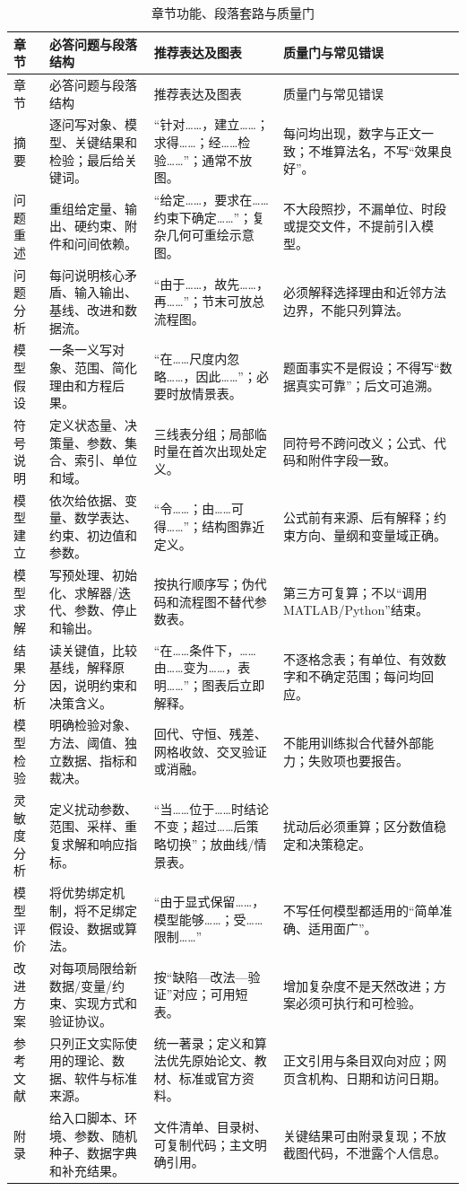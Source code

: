 \documentclass[UTF8,a4paper,12pt]{ctexart}
\begin{document}
\begin{longtable}{p{1.8cm}p{4.2cm}p{4.0cm}p{4.0cm}}
\caption{章节功能、段落套路与质量门}\label{tab:sections}\\
\toprule
章节 & 必答问题与段落结构 & 推荐表达及图表 & 质量门与常见错误\\
\midrule
\endfirsthead
\toprule
章节 & 必答问题与段落结构 & 推荐表达及图表 & 质量门与常见错误\\
\midrule
\endhead
摘要 & 逐问写对象、模型、关键结果和检验；最后给关键词。 & “针对……，建立……；求得……；经……检验……”；通常不放图。 & 每问均出现，数字与正文一致；不堆算法名，不写“效果良好”。\\
问题重述 & 重组给定量、输出、硬约束、附件和问间依赖。 & “给定……，要求在……约束下确定……”；复杂几何可重绘示意图。 & 不大段照抄，不漏单位、时段或提交文件，不提前引入模型。\\
问题分析 & 每问说明核心矛盾、输入输出、基线、改进和数据流。 & “由于……，故先……，再……”；节末可放总流程图。 & 必须解释选择理由和近邻方法边界，不能只列算法。\\
模型假设 & 一条一义写对象、范围、简化理由和方程后果。 & “在……尺度内忽略……，因此……”；必要时放情景表。 & 题面事实不是假设；不得写“数据真实可靠”；后文可追溯。\\
符号说明 & 定义状态量、决策量、参数、集合、索引、单位和域。 & 三线表分组；局部临时量在首次出现处定义。 & 同符号不跨问改义；公式、代码和附件字段一致。\\
模型建立 & 依次给依据、变量、数学表达、约束、初边值和参数。 & “令……；由……可得……”；结构图靠近定义。 & 公式前有来源、后有解释；约束方向、量纲和变量域正确。\\
模型求解 & 写预处理、初始化、求解器/迭代、参数、停止和输出。 & 按执行顺序写；伪代码和流程图不替代参数表。 & 第三方可复算；不以“调用 MATLAB/Python”结束。\\
结果分析 & 读关键值，比较基线，解释原因，说明约束和决策含义。 & “在……条件下，……由……变为……，表明……”；图表后立即解释。 & 不逐格念表；有单位、有效数字和不确定范围；每问均回应。\\
模型检验 & 明确检验对象、方法、阈值、独立数据、指标和裁决。 & 回代、守恒、残差、网格收敛、交叉验证或消融。 & 不能用训练拟合代替外部能力；失败项也要报告。\\
灵敏度分析 & 定义扰动参数、范围、采样、重复求解和响应指标。 & “当……位于……时结论不变；超过……后策略切换”；放曲线/情景表。 & 扰动后必须重算；区分数值稳定和决策稳定。\\
模型评价 & 将优势绑定机制，将不足绑定假设、数据或算法。 & “由于显式保留……，模型能够……；受……限制……” & 不写任何模型都适用的“简单准确、适用面广”。\\
改进方案 & 对每项局限给新数据/变量/约束、实现方式和验证协议。 & 按“缺陷—改法—验证”对应；可用短表。 & 增加复杂度不是天然改进；方案必须可执行和可检验。\\
参考文献 & 只列正文实际使用的理论、数据、软件与标准来源。 & 统一著录；定义和算法优先原始论文、教材、标准或官方资料。 & 正文引用与条目双向对应；网页含机构、日期和访问日期。\\
附录 & 给入口脚本、环境、参数、随机种子、数据字典和补充结果。 & 文件清单、目录树、可复制代码；主文明确引用。 & 关键结果可由附录复现；不放截图代码，不泄露个人信息。\\
\bottomrule
\end{longtable}
\end{document}
